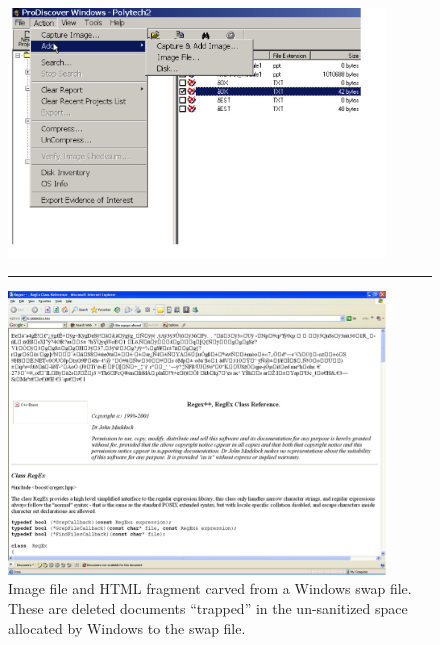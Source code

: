 \begin{figure}[ht]
\center
\includegraphics[width=100mm]{ch-carving/imageinswap.png}
\vspace{3mm}
\noindent\rule{60mm}{1pt}
\vspace{3mm}
\includegraphics[width=100mm]{ch-carving/cacheinswap.png}
\caption{Image file and HTML fragment carved from a Windows swap file.  These are deleted documents ``trapped'' in the un-sanitized space allocated by Windows to the swap file.}
\label{fig:insideswapfile}
\end{figure}

